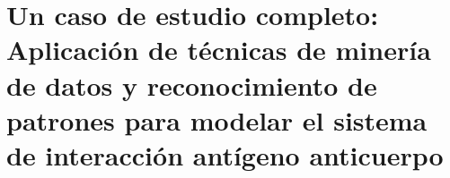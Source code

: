 \chapter{Un caso de estudio completo: Aplicación de técnicas de minería de datos y reconocimiento de patrones para modelar el sistema de interacción antígeno anticuerpo}

\ifpdf
    \graphicspath{{Chapter7/Figs/Raster/}{Chapter7/Figs/PDF/}{Chapter7/Figs/}}
\else
    \graphicspath{{Chapter7/Figs/Vector/}{Chapter7/Figs/}}
\fi
